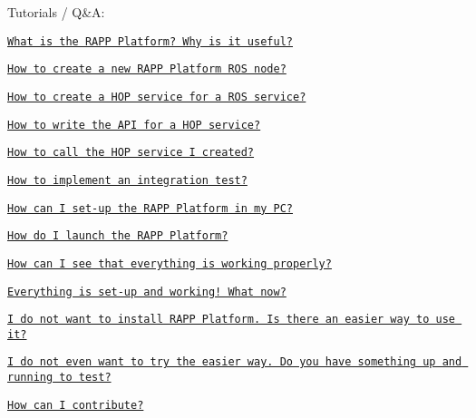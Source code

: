 Tutorials / Q\&A\-:
\begin{DoxyItemize}
\item \href{https://github.com/rapp-project/rapp-platform/wiki/What-is-the-RAPP-Platform%3F-Why-is-it-useful%3F}{\tt What is the R\-A\-P\-P Platform? Why is it useful?}
\item \href{https://github.com/rapp-project/rapp-platform/wiki/How-to-create-a-new-RAPP-Platform-ROS-node%3F}{\tt How to create a new R\-A\-P\-P Platform R\-O\-S node?}
\item \href{https://github.com/rapp-project/rapp-platform/wiki/How-to-create-a-HOP-service-for-a-ROS-service%3F}{\tt How to create a H\-O\-P service for a R\-O\-S service?}
\item \href{https://github.com/rapp-project/rapp-platform/wiki/How-to-write-the-API-for-a-HOP-service%3F}{\tt How to write the A\-P\-I for a H\-O\-P service?}
\item \href{https://github.com/rapp-project/rapp-platform/wiki/How-to-call-the-HOP-service-I-created%3F}{\tt How to call the H\-O\-P service I created?}
\item \href{https://github.com/rapp-project/rapp-platform/wiki/How-to-implement-an-integration-test%3F}{\tt How to implement an integration test?}
\item \href{https://github.com/rapp-project/rapp-platform/wiki/How-can-I-set-up-the-RAPP-Platform-in-my-PC%3F}{\tt How can I set-\/up the R\-A\-P\-P Platform in my P\-C?}
\item \href{https://github.com/rapp-project/rapp-platform/wiki/How-do-I-launch-the-RAPP-Platform%3F}{\tt How do I launch the R\-A\-P\-P Platform?}
\item \href{https://github.com/rapp-project/rapp-platform/wiki/How-can-I-see-that-everything-is-working-properly%3F}{\tt How can I see that everything is working properly?}
\item \href{https://github.com/rapp-project/rapp-platform/wiki/Everything-is-set-up-and-working!-What-now%3F}{\tt Everything is set-\/up and working! What now?}
\item \href{https://github.com/rapp-project/rapp-platform/wiki/I-do-not-want-to-install-RAPP-Platform.-Is-there-an-easier-way-to-use-it%3F}{\tt I do not want to install R\-A\-P\-P Platform. Is there an easier way to use it?}
\item \href{https://github.com/rapp-project/rapp-platform/wiki/I-do-not-even-want-to-try-the-easier-way.-Do-you-have-something-up-and-running-to-test%3F}{\tt I do not even want to try the easier way. Do you have something up and running to test?}
\item \href{https://github.com/rapp-project/rapp-platform/wiki/How-can-I-contribute%3F}{\tt How can I contribute?} 
\end{DoxyItemize}